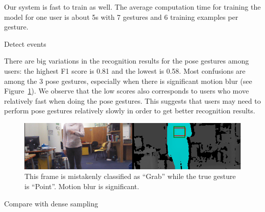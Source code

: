 Our system is fast to train as well. The average computation time for training
the model for one user is about 5s with 7 gestures and 6 training examples per
gesture.

Detect events

There are big variations in the recognition results for the pose gestures among
users: the highest F1 score is 0.81 and the lowest is 0.58. Most confusions are among the 3 pose gestures, especially when there is
significant motion blur (see Figure~\ref{fig:point_grab}). We observe that
the low scores also corresponds to users who move relatively fast when doing the
pose gestures. This suggests that users may need to perform pose gestures
relatively slowly in order to get better recognition results. 

\begin{figure}[tbh]
\centering
\includegraphics[width=\linewidth]{figures/point_blur.png}
\caption{This frame is mistakenly classified as ``Grab'' while the true gesture
is ``Point''. Motion blur is significant.}
\label{fig:point_grab}
\end{figure}

Compare with dense sampling
